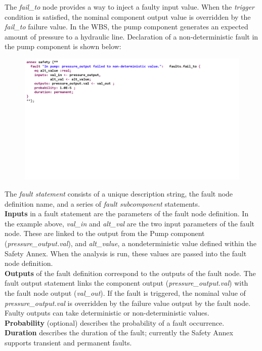 The \textit{fail\_to} node provides a way to inject a faulty input value. When the \textit{trigger} condition is satisfied, the nominal component output value is overridden by the \textit{fail\_to} failure value. In the WBS, the pump component generates an expected amount of pressure to a hydraulic line.  Declaration of a non-deterministic fault in the pump component is shown below:
\begin{figure}[h!]
	\vspace{-0.17in}
	\begin{center}
		\includegraphics[trim=0 330 150 0,clip,width=1.0\textwidth]{images/annex.png}
	\end{center}
	\vspace{-0.40in}
\end{figure}

The \textit{fault statement} consists of a unique description string, the fault node definition name, and a series of \textit{fault subcomponent} statements. \\
\textbf{Inputs} in a fault statement are the parameters of the fault node definition. In the example above, \textit{val\_in} and \textit{alt\_val} are the two input parameters of the fault node. These are linked to the output from the Pump component (\textit{pressure\_output.val}), and \textit{alt\_value}, a nondeterministic value defined within the Safety Annex. When the analysis is run, these values are passed into the fault node definition.\\
\textbf{Outputs} of the fault definition correspond to the outputs of the fault node. The fault output statement links the component output (\textit{pressure\_output.val}) with the fault node output (\textit{val\_out}). If the fault is triggered, the nominal value of \textit{pressure\_output.val} is overridden by the failure value output by the fault node. Faulty outputs can take deterministic or non-deterministic values. \\
\textbf{Probability} (optional) describes the probability of a fault occurrence.\\
\textbf{Duration} describes the duration of the fault; currently the Safety Annex supports transient and permanent faults.\\

